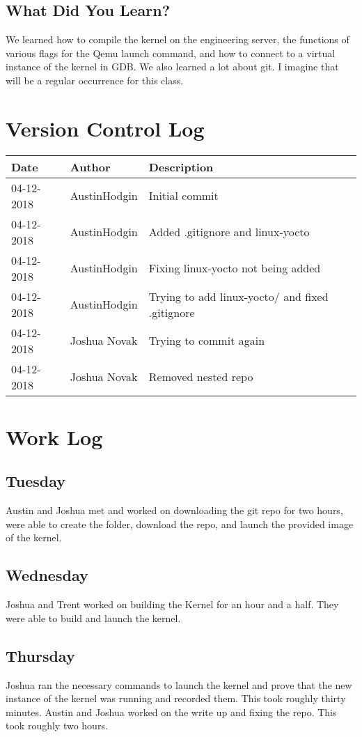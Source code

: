 \documentclass[onecolumn, draftclsnofoot,10pt, compsoc]{IEEEtran}
\begin{document}
    \subsection{What Did You Learn?}
    We learned how to compile the kernel on the engineering server, the functions of various flags for the Qemu launch command, and how to connect to a virtual instance of the kernel in GDB. We also learned a lot about git. I imagine that will be a regular occurrence for this class.

\section{Version Control Log}

    \begin{center}
        \begin{tabular}{l l l} \textbf{Date} & \textbf{Author} & \textbf{Description}\\\hline
             04-12-2018 & AustinHodgin & Initial commit\\\hline
             04-12-2018 &  AustinHodgin & Added .gitignore and linux-yocto\\\hline
             04-12-2018 &  AustinHodgin & Fixing linux-yocto not being added\\\hline
             04-12-2018 &  AustinHodgin & Trying to add linux-yocto/ and fixed .gitignore\\\hline
             04-12-2018 &  Joshua Novak & Trying to commit again\\\hline
             04-12-2018 &  Joshua Novak & Removed nested repo\\\hline\end{tabular}
    \end{center}

\section{Work Log}
    \subsection{Tuesday}
    Austin and Joshua met and worked on downloading the git repo for two hours, were able to create the folder, download the repo, and launch the provided image of the kernel.
    \subsection{Wednesday}
    Joshua and Trent worked on building the Kernel for an hour and a half. They were able to build and launch the kernel.
    \subsection{Thursday}
    Joshua ran the necessary commands to launch the kernel and prove that the new instance of the kernel was running and recorded them. This took roughly thirty minutes. Austin and Joshua worked on the write up and fixing the repo. This took roughly two hours.



\end{document}
